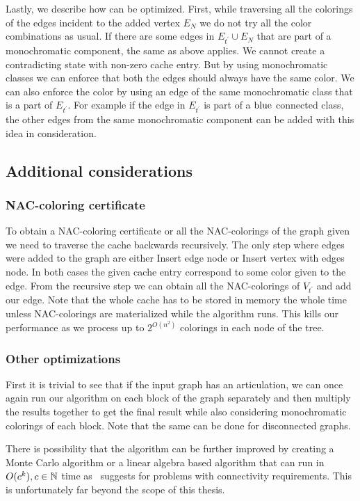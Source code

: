 Lastly, we describe how \IntroduceVertexWithEdgesNode{} can be optimized.
First, while traversing all the colorings of the edges incident to the added vertex \( E_N \)
we do not try all the color combinations as usual. If there are some edges
in \( E_{t^\prime} \cup E_N \) that are part of a monochromatic component,
the same as above applies. We cannot create a contradicting state with non-zero
cache entry. But by using monochromatic classes
we can enforce that both the edges should always have the same color.
We can also enforce the color by using an edge of the same monochromatic class
that is a part of \( E_{t^\prime} \).
For example if the edge in \( E_{t^\prime} \) is part of a \( \text{blue} \) connected class,
the other edges from the same monochromatic component can be added with
this idea in consideration.




\subsection{Additional considerations}

\subsubsection{NAC-coloring certificate}

To obtain a NAC-coloring certificate or all the NAC-colorings of the graph
given we need to traverse the cache backwards recursively.
The only step where edges were added to the graph are either Insert edge node
or Insert vertex with edges node. In both cases the given cache entry correspond
to some color given to the edge. From the recursive step we can obtain
all the NAC-colorings of \( V_{t^\prime} \) and add our edge.
Note that the whole cache has to be stored in memory the whole time unless
NAC-colorings are materialized while the algorithm runs.
This kills our performance as we process up to \( 2^{O(n^2)} \) colorings
in each node of the tree.

\subsubsection{Other optimizations}

First it is trivial to see that if the input graph has an articulation,
we can once again run our algorithm on each block of the graph separately
and then multiply the results together to get the final result
while also considering monochromatic colorings of each block.
Note that the same can be done for disconnected graphs.

There is possibility that the algorithm can be further improved by creating
a Monte Carlo algorithm or a linear algebra based algorithm that can run
in \( O(c^k), c \in \mathbb{N} \) time as~\cite{book_parametrized_algorithms} suggests
for problems with connectivity requirements.
This is unfortunately far beyond the scope of this thesis.


